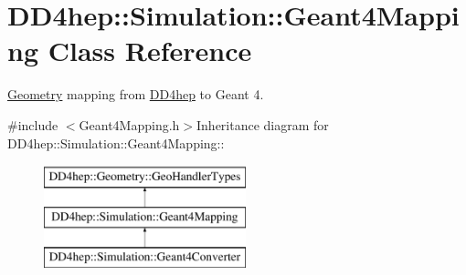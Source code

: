 \hypertarget{class_d_d4hep_1_1_simulation_1_1_geant4_mapping}{
\section{DD4hep::Simulation::Geant4Mapping Class Reference}
\label{class_d_d4hep_1_1_simulation_1_1_geant4_mapping}
}


\hyperlink{namespace_d_d4hep_1_1_geometry}{Geometry} mapping from \hyperlink{namespace_d_d4hep}{DD4hep} to Geant 4.  


{\ttfamily \#include $<$Geant4Mapping.h$>$}Inheritance diagram for DD4hep::Simulation::Geant4Mapping::\begin{figure}[H]
\begin{center}
\leavevmode
\includegraphics[height=3cm]{class_d_d4hep_1_1_simulation_1_1_geant4_mapping}
\end{center}
\end{figure}
